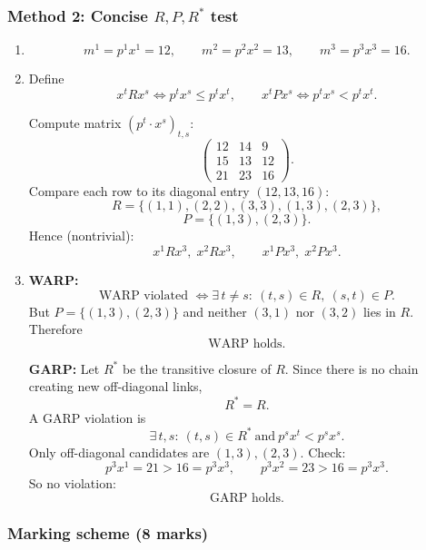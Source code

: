 \documentclass[12pt]{article}
\begin{document}
\newpage
\subsubsection*{Method 2: Concise \(R,P,R^*\) test}

\begin{enumerate}[label=(\alph*)]
\item
\[
m^1=p^1x^1=12,\qquad m^2=p^2x^2=13,\qquad m^3=p^3x^3=16.
\]

\item Define
\[
x^t R x^s \iff p^t x^s \le p^t x^t,\qquad
x^t P x^s \iff p^t x^s < p^t x^t.
\]

Compute matrix \((p^t\cdot x^s)_{t,s}\):
\[
\begin{pmatrix}
12 & 14 & 9\\
15 & 13 & 12\\
21 & 23 & 16
\end{pmatrix}.
\]
Compare each row to its diagonal entry \((12,13,16)\):
\[
R=\{(1,1),(2,2),(3,3),(1,3),(2,3)\},
\]
\[
P=\{(1,3),(2,3)\}.
\]
Hence (nontrivial):
\[
\boxed{x^1 R x^3,\;x^2 R x^3},\qquad
\boxed{x^1 P x^3,\;x^2 P x^3}.
\]

\item \textbf{WARP:}
\[
\text{WARP violated } \iff \exists\, t\neq s:\ (t,s)\in R,\ (s,t)\in P.
\]
But \(P=\{(1,3),(2,3)\}\) and neither \((3,1)\) nor \((3,2)\) lies in \(R\). Therefore
\[
\boxed{\text{WARP holds.}}
\]

\textbf{GARP:} Let \(R^*\) be the transitive closure of \(R\). Since there is no chain creating new off-diagonal links,
\[
R^*=R.
\]
A GARP violation is
\[
\exists\, t,s:\ (t,s)\in R^* \ \text{and}\ p^s x^t < p^s x^s.
\]
Only off-diagonal candidates are \((1,3),(2,3)\). Check:
\[
p^3x^1=21>16=p^3x^3,\qquad p^3x^2=23>16=p^3x^3.
\]
So no violation:
\[
\boxed{\text{GARP holds.}}
\]
\end{enumerate}

\newpage

\subsubsection*{Marking scheme (8 marks)}
\end{document}
